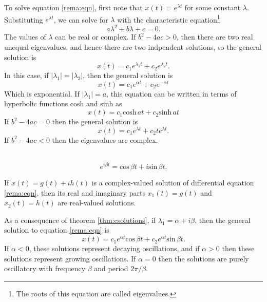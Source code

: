 \documentclass[nobib,notoc]{tufte-handout}
\begin{document}
\begin{defi}
	To solve equation \ref{rema:eqn}, first note that \(x(t)=e^{\lambda t}\) for some constant \(\lambda\). Substituting \(e^{\lambda t}\), we can solve for \(\lambda\) with the characteristic equation\footnote{The roots of this equation are called eigenvalues.}
	\begin{equation*}
		a\lambda^2+b\lambda+c=0.
	\end{equation*}
	The values of \(\lambda\) can be real or complex. If \(b^2-4ac>0\), then there are two real unequal eigenvalues, and hence there are two indpendent solutions, so the general solution is
	\begin{equation*}
		x(t)=c_1e^{\lambda_1 t}+c_2e^{\lambda_2 t}.
	\end{equation*}
	In this case, if \(\lvert\lambda_1\rvert=\lvert\lambda_2\rvert\), then the general solution is
	\begin{equation*}
		x(t)=c_1e^{\alpha t}+c_2e^{-\alpha t}
	\end{equation*}
	Which is exponential. If \(\lvert \lambda_1\rvert=a\), this equation can be written in terms of hyperbolic functions cosh and sinh as
	\begin{equation*}
		x(t)=c_1\text{cosh}\,at+c_2\text{sinh}\,at
	\end{equation*}
	If \(b^2-4ac=0\) then the general solution is
	\begin{equation*}
		x(t)=c_1e^{\lambda t}+c_2te^{\lambda t}.
	\end{equation*}
	If \(b^2-4ac<0\) then the eigenvalues are complex.
\end{defi}
\begin{defi}
	\,
	\begin{equation*}
		e^{i\beta t}=\text{cos}\,\beta t+i\text{sin}\,\beta t.
	\end{equation*}
\end{defi}
\begin{thm}
	\label{thm:csolutions}
If \(x(t)=g(t)+ih(t)\) is a complex-valued solution of differential equation \ref{rema:eqn}, then its real and imaginary parts \(x_1(t)=g(t)\) and \(x_2(t)=h(t)\) are real-valued solutions.
\end{thm}
\begin{rema}
	As a consequence of theorem \ref{thm:csolutions}, if \(\lambda_1=\alpha+i\beta\), then the general solution to equation \ref{rema:eqn} is
	\begin{equation*}
		x(t)=c_1e^{\alpha t}\text{cos}\,\beta t+c_2e^{\alpha t}\text{sin}\,\beta t.
	\end{equation*}
	If \(\alpha<0\), these solutions represent decaying oscillations, and if \(\alpha>0\) then these solutions represent growing oscillations. If \(\alpha=0\) then the solutions are purely oscillatory with frequency \(\beta\) and period \(2\pi/\beta\).
\end{rema}
\end{document}
